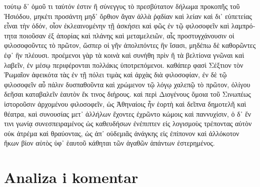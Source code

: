 {\large

\begin{greek}

\noindent τούτῳ δ᾽ ὁμοῦ τι ταὐτόν ἐστιν ἢ σύνεγγυς τὸ πρεσβύτατον δήλωμα προκοπῆς τοῦ Ἡσιόδου, μηκέτι προσάντη μηδ᾽ ὄρθιον ἄγαν ἀλλὰ ῥᾳδίαν καὶ λείαν καὶ δι᾽ εὐπετείας εἶναι τὴν ὁδόν, οἷον ἐκλεαινομένην τῇ ἀσκήσει καὶ φῶς ἐν τῷ φιλοσοφεῖν καὶ λαμπρότητα ποιοῦσαν ἐξ ἀπορίας καὶ πλάνης καὶ μεταμελειῶν, αἷς προστυγχάνουσιν οἱ φιλοσοφοῦντες  τὸ πρῶτον, ὥσπερ οἱ γῆν ἀπολιπόντες ἣν ἴσασι, μηδέπω δὲ καθορῶντες ἐφ᾽ ἣν πλέουσι. προέμενοι γὰρ τὰ κοινὰ καὶ συνήθη πρὶν ἢ τὰ βελτίονα γνῶναι καὶ λαβεῖν, ἐν μέσῳ περιφέρονται πολλάκις ὑποτρεπόμενοι. καθάπερ φασὶ Σέξτιον τὸν Ῥωμαῖον ἀφεικότα τὰς ἐν τῇ πόλει τιμὰς καὶ ἀρχὰς διὰ φιλοσοφίαν, ἐν δὲ τῷ φιλοσοφεῖν αὖ πάλιν δυσπαθοῦντα καὶ χρώμενον τῷ λόγῳ χαλεπῷ τὸ πρῶτον, ὀλίγου δεῆσαι καταβαλεῖν ἑαυτὸν ἔκ τινος διήρους. καὶ περὶ Διογένους ὅμοια τοῦ Σινωπέως ἱστοροῦσιν ἀρχομένου φιλοσοφεῖν, ὡς Ἀθηναίοις ἦν ἑορτὴ καὶ δεῖπνα δημοτελῆ καὶ θέατρα, καὶ συνουσίας μετ᾽ ἀλλήλων ἔχοντες ἐχρῶντο κώμοις καὶ παννυχίσιν, ὁ δ᾽ ἔν τινι γωνίᾳ συνεσπειραμένος ὡς καθευδήσων ἐνέπιπτεν εἰς λογισμοὺς τρέποντας αὐτὸν οὐκ ἀτρέμα καὶ θραύοντας, ὡς ἀπ᾽ οὐδεμιᾶς ἀνάγκης εἰς ἐπίπονον καὶ ἀλλόκοτον ἥκων βίον αὐτὸς ὑφ᾽ ἑαυτοῦ κάθηται τῶν ἀγαθῶν ἁπάντων ἐστερημένος.

\end{greek}

}


\section*{Analiza i komentar}


